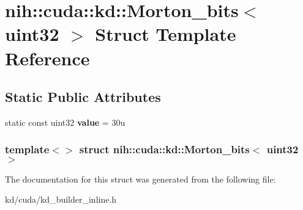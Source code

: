 \hypertarget{structnih_1_1cuda_1_1kd_1_1_morton__bits_3_01uint32_01_4}{
\section{nih\-:\-:cuda\-:\-:kd\-:\-:\-Morton\-\_\-bits$<$ uint32 $>$ \-Struct \-Template \-Reference}
\label{structnih_1_1cuda_1_1kd_1_1_morton__bits_3_01uint32_01_4}
}
\subsection*{\-Static \-Public \-Attributes}
\begin{DoxyCompactItemize}
\item 
\hypertarget{structnih_1_1cuda_1_1kd_1_1_morton__bits_3_01uint32_01_4_ab36cfb07a9326a6b370f5f7ae9163433}{
static const uint32 {\bfseries value} = 30u}
\label{structnih_1_1cuda_1_1kd_1_1_morton__bits_3_01uint32_01_4_ab36cfb07a9326a6b370f5f7ae9163433}

\end{DoxyCompactItemize}
\subsubsection*{template$<$$>$ struct nih\-::cuda\-::kd\-::\-Morton\-\_\-bits$<$ uint32 $>$}



\-The documentation for this struct was generated from the following file\-:\begin{DoxyCompactItemize}
\item 
kd/cuda/kd\-\_\-builder\-\_\-inline.\-h\end{DoxyCompactItemize}
